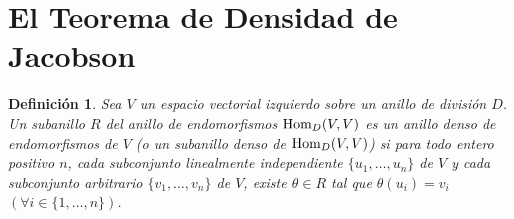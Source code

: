 \documentclass{report}
\newcommand{\Hom}{\textnormal{Hom}}
\newtheorem{definition}{Definición}
\begin{document}
  \section{El Teorema de Densidad de Jacobson}

  \begin{definition}
    Sea \(V\) un espacio vectorial izquierdo sobre un anillo de división \(D\).
    Un subanillo \(R\) del anillo de endomorfismos \(\Hom_D(V, V)\) es un \emph{anillo denso de endomorfismos} de \(V\) (o un \emph{subanillo denso} de \(\Hom_D(V, V)\)) si para todo entero positivo \(n\), cada subconjunto linealmente independiente \(\{u_1, \dots, u_n\}\) de \(V\) y cada subconjunto arbitrario \(\{v_1, \dots, v_n\}\) de \(V\), existe \(\theta \in R\) tal que \(\theta(u_i) = v_i\) \((\forall i \in \{1, \dots, n\})\).
  \end{definition}
\end{document}

